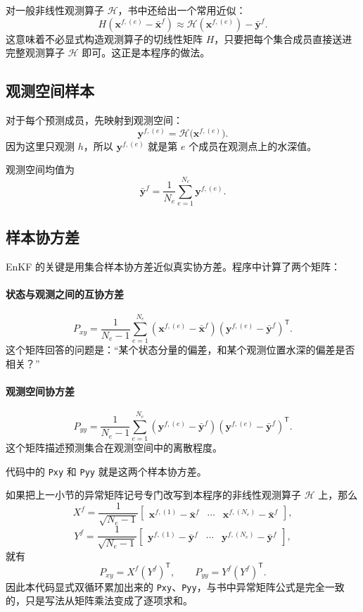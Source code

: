 \documentclass[12pt,a4paper]{article}
\begin{document}
对一般非线性观测算子 $\mathcal{H}$，书中还给出一个常用近似：
\[
H\left(\mathbf{x}^{f,(e)}-\bar{\mathbf{x}}^f\right)
\approx
\mathcal{H}\left(\mathbf{x}^{f,(e)}\right)-\bar{\mathbf{y}}^f.
\]
这意味着不必显式构造观测算子的切线性矩阵 $H$，只要把每个集合成员直接送进完整观测算子 $\mathcal{H}$ 即可。这正是本程序的做法。

\subsection{观测空间样本}

对于每个预测成员，先映射到观测空间：
\[
\mathbf{y}^{f,(e)} = \mathcal{H}\bigl(\mathbf{x}^{f,(e)}\bigr).
\]
因为这里只观测 $h$，所以 $\mathbf{y}^{f,(e)}$ 就是第 $e$ 个成员在观测点上的水深值。

观测空间均值为
\[
\bar{\mathbf{y}}^f = \frac{1}{N_e}\sum_{e=1}^{N_e}\mathbf{y}^{f,(e)}.
\]

\subsection{样本协方差}

EnKF 的关键是用集合样本协方差近似真实协方差。程序中计算了两个矩阵：

\paragraph{状态与观测之间的互协方差}
\[
P_{xy}
= \frac{1}{N_e-1}
\sum_{e=1}^{N_e}
\left(\mathbf{x}^{f,(e)}-\bar{\mathbf{x}}^f\right)
\left(\mathbf{y}^{f,(e)}-\bar{\mathbf{y}}^f\right)^{\mathsf T}.
\]
这个矩阵回答的问题是：“某个状态分量的偏差，和某个观测位置水深的偏差是否相关？”

\paragraph{观测空间协方差}
\[
P_{yy}
= \frac{1}{N_e-1}
\sum_{e=1}^{N_e}
\left(\mathbf{y}^{f,(e)}-\bar{\mathbf{y}}^f\right)
\left(\mathbf{y}^{f,(e)}-\bar{\mathbf{y}}^f\right)^{\mathsf T}.
\]
这个矩阵描述预测集合在观测空间中的离散程度。

代码中的 \texttt{Pxy} 和 \texttt{Pyy} 就是这两个样本协方差。

如果把上一小节的异常矩阵记号专门改写到本程序的非线性观测算子 $\mathcal{H}$ 上，那么
\[
X^f
= \frac{1}{\sqrt{N_e-1}}
\begin{bmatrix}
\mathbf{x}^{f,(1)}-\bar{\mathbf{x}}^f &
\cdots &
\mathbf{x}^{f,(N_e)}-\bar{\mathbf{x}}^f
\end{bmatrix},
\]
\[
Y^f
= \frac{1}{\sqrt{N_e-1}}
\begin{bmatrix}
\mathbf{y}^{f,(1)}-\bar{\mathbf{y}}^f &
\cdots &
\mathbf{y}^{f,(N_e)}-\bar{\mathbf{y}}^f
\end{bmatrix},
\]
就有
\[
P_{xy}=X^f(Y^f)^{\mathsf T},
\qquad
P_{yy}=Y^f(Y^f)^{\mathsf T}.
\]
因此本代码显式双循环累加出来的 \texttt{Pxy}、\texttt{Pyy}，与书中异常矩阵公式是完全一致的，只是写法从矩阵乘法变成了逐项求和。
\end{document}
